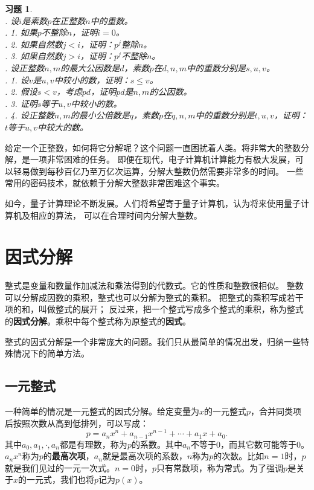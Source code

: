 \documentclass[12pt,UTF8]{ctexbook}
\newtheorem{xt}{习题}[section]
\begin{document}
\begin{xt}\label{xt:1-1-1}
    \mbox{}\\
    . 设$i$是素数$p$在正整数$n$中的重数。\\
    . 1. 如果$p$不整除$n$，证明$i = 0$。\\
    . 2. 如果自然数$j < i$，证明：$p^j$整除$n$。\\
    . 3. 如果自然数$j > i$，证明：$p^j$不整除$n$。\\
    . 设正整数$n,m$的最大公因数是$d$，素数$p$在$d,n,m$中的重数分别是$s,u,v$。\\
    . 1. 设$v$是$u,v$中较小的数，证明：$s \leqslant v$。\\
    . 2. 假设$s < v$，考虑$pd$，证明$pd$是$n,m$的公因数。\\
    . 3. 证明$s$等于$u,v$中较小的数。 \\
    . 4. 设正整数$n,m$的最小公倍数是$q$，素数$p$在$q,n,m$中的重数分别是$t,u,v$，证明：$t$等于$u,v$中较大的数。\\
\end{xt}

给定一个正整数，如何将它分解呢？这个问题一直困扰着人类。将非常大的整数分解，是一项非常困难的任务。
即便在现代，电子计算机计算能力有极大发展，可以轻易做到每秒百亿乃至万亿次运算，分解大整数仍然需要非常多的时间。
一些常用的密码技术，就依赖于分解大整数非常困难这个事实。

如今，量子计算理论不断发展。人们将希望寄于量子计算机，认为将来使用量子计算机及相应的算法，
可以在合理时间内分解大整数。

\chapter{因式分解}
整式是变量和数量作加减法和乘法得到的代数式。它的性质和整数很相似。
整数可以分解成因数的乘积，整式也可以分解为整式的乘积。
把整式的乘积写成若干项的和，叫做整式的展开；
反过来，把一个整式写成多个整式的乘积，称为整式的\textbf{因式分解}。乘积中每个整式称为原整式的\textbf{因式}。

整式的因式分解是一个非常庞大的问题。我们只从最简单的情况出发，归纳一些特殊情况下的简单方法。

\section{一元整式}
一种简单的情况是一元整式的因式分解。给定变量为$x$的一元整式$p$，合并同类项后按照次数从高到低排列，可以写成：
$$ p = a_nx^n + a_{n-1}x^{n-1} + \cdots + a_1 x + a_0.$$
其中$a_0, a_1, \cdot , a_n$都是有理数，称为$p$的系数。其中$a_n$不等于$0$，而其它数可能等于$0$。
$a_nx^n$称为$p$的\textbf{最高次项}，$a_n$就是最高次项的系数，$n$称为$p$的次数。比如$n=1$时，$p$
就是我们见过的一元一次式。$n=0$时，$p$只有常数项，称为常式。为了强调$p$是关于$x$的一元式，我们也将$p$记为$p(x)$。
\end{document}
